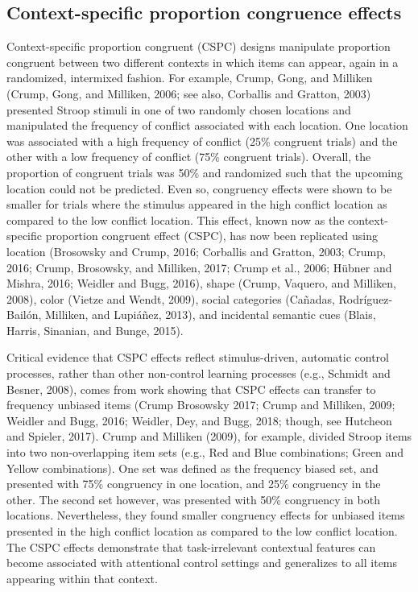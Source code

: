 \documentclass[]{DissertateCUNY}
\begin{document}
\hypertarget{context-specific-proportion-congruence-effects}{%
\subsection{Context-specific proportion congruence
effects}\label{context-specific-proportion-congruence-effects}}

Context-specific proportion congruent (CSPC) designs manipulate
proportion congruent between two different contexts in which items can
appear, again in a randomized, intermixed fashion. For example, Crump,
Gong, and Milliken (Crump, Gong, and Milliken, 2006; see also, Corballis
and Gratton, 2003) presented Stroop stimuli in one of two randomly
chosen locations and manipulated the frequency of conflict associated
with each location. One location was associated with a high frequency of
conflict (25\% congruent trials) and the other with a low frequency of
conflict (75\% congruent trials). Overall, the proportion of congruent
trials was 50\% and randomized such that the upcoming location could not
be predicted. Even so, congruency effects were shown to be smaller for
trials where the stimulus appeared in the high conflict location as
compared to the low conflict location. This effect, known now as the
context-specific proportion congruent effect (CSPC), has now been
replicated using location (Brosowsky and Crump, 2016; Corballis and
Gratton, 2003; Crump, 2016; Crump, Brosowsky, and Milliken, 2017; Crump
et al., 2006; Hübner and Mishra, 2016; Weidler and Bugg, 2016), shape
(Crump, Vaquero, and Milliken, 2008), color (Vietze and Wendt, 2009),
social categories (Cañadas, Rodríguez-Bailón, Milliken, and Lupiáñez,
2013), and incidental semantic cues (Blais, Harris, Sinanian, and Bunge,
2015).

Critical evidence that CSPC effects reflect stimulus-driven, automatic
control processes, rather than other non-control learning processes
(e.g., Schmidt and Besner, 2008), comes from work showing that CSPC
effects can transfer to frequency unbiased items (Crump Brosowsky 2017;
Crump and Milliken, 2009; Weidler and Bugg, 2016; Weidler, Dey, and
Bugg, 2018; though, see Hutcheon and Spieler, 2017). Crump and Milliken
(2009), for example, divided Stroop items into two non-overlapping item
sets (e.g., Red and Blue combinations; Green and Yellow combinations).
One set was defined as the frequency biased set, and presented with 75\%
congruency in one location, and 25\% congruency in the other. The second
set however, was presented with 50\% congruency in both locations.
Nevertheless, they found smaller congruency effects for unbiased items
presented in the high conflict location as compared to the low conflict
location. The CSPC effects demonstrate that task-irrelevant contextual
features can become associated with attentional control settings and
generalizes to all items appearing within that context.
\end{document}
